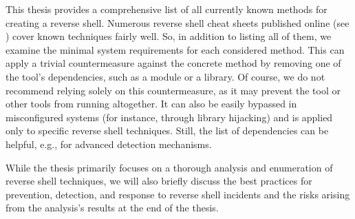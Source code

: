 This thesis provides a comprehensive list of all currently known methods for creating a reverse shell. Numerous reverse shell cheat sheets published online (see \cite{cheatsheet1, cheatsheet2, cheatsheet3}) cover known techniques fairly well. So, in addition to listing all of them, we examine the minimal system requirements for each considered method. This can apply a trivial countermeasure against the concrete method by removing one of the tool's dependencies, such as a module or a library. Of course, we do not recommend relying solely on this countermeasure, as it may prevent the tool or other tools from running altogether. It can also be easily bypassed in misconfigured systems (for instance, through library hijacking) and is applied only to specific reverse shell techniques. Still, the list of dependencies can be helpful, e.g., for advanced detection mechanisms.

While the thesis primarily focuses on a thorough analysis and enumeration of reverse shell techniques, we will also briefly discuss the best practices for prevention, detection, and response to reverse shell incidents and the risks arising from the analysis's results at the end of the thesis.
